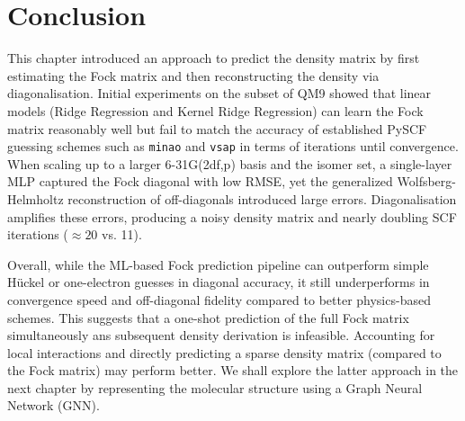 \section{Conclusion}
\label{sec:fock_matrix_prediction_conclusion}
This chapter introduced an approach to predict the density matrix by first estimating the Fock matrix and then reconstructing the density via diagonalisation. Initial experiments on the  subset of QM9 showed that linear models (Ridge Regression and Kernel Ridge Regression) can learn the Fock matrix reasonably well but fail to match the accuracy of established PySCF guessing schemes such as \texttt{minao} and \texttt{vsap} in terms of iterations until convergence. When scaling up to a larger 6-31G(2df,p) basis and the  isomer set, a single-layer MLP captured the Fock diagonal with low RMSE, yet the generalized Wolfsberg-Helmholtz reconstruction of off-diagonals introduced large errors. Diagonalisation amplifies these errors, producing a noisy density matrix and nearly doubling SCF iterations ($\approx20$ vs. 11).

Overall, while the ML-based Fock prediction pipeline can outperform simple Hückel or one-electron guesses in diagonal accuracy, it still underperforms in convergence speed and off-diagonal fidelity compared to better physics-based schemes. This suggests that a one-shot prediction of the full Fock matrix simultaneously ans subsequent density derivation is infeasible. Accounting for local interactions and directly predicting a sparse density matrix (compared to the Fock matrix) may perform  better. We shall explore the latter approach in the next chapter by representing the molecular structure using a Graph Neural Network (GNN). 

